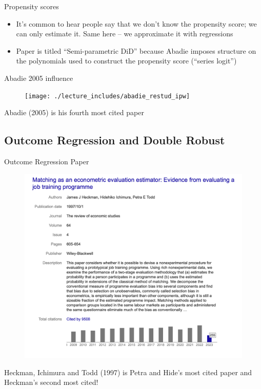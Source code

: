 \documentclass{beamer}
\begin{document}
\begin{frame}{Propensity scores}

\begin{itemize}
\item It's common to hear people say that we don't know the propensity score; we can only estimate it. Same here -- we approximate it with regressions
\item Paper is titled ``Semi-parametric DiD'' because Abadie imposes structure on the polynomials used to construct the propensity score (``series logit'')
\end{itemize}

\end{frame}



\begin{frame}{Abadie 2005 influence}

	\begin{figure}
	\texttt{[image: ./lecture\_includes/abadie\_restud\_ipw]}
	\end{figure}Abadie (2005) is his fourth most cited paper

\end{frame}




\subsection{Outcome Regression and Double Robust}

\begin{frame}{Outcome Regression Paper}

	\begin{figure}
	\includegraphics[scale=0.25]{./lecture_includes/or_cites}
	\end{figure}Heckman, Ichimura and Todd (1997) is Petra and Hide's most cited paper and Heckman's second most cited!

\end{frame}
\end{document}
